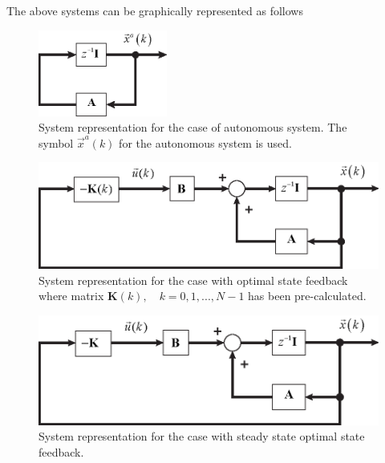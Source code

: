 \documentclass[11pt,a4paper,oneside]{book}
\numberwithin{equation}{section}
\theoremstyle{it}
\theoremstyle{definition}
\begin{document}
The above systems can be graphically represented as follows
\begin{figure}[H]
	\centering
	\includegraphics[width = 120pt, 
	keepaspectratio]{figures/optimal_control/autonomus_system.eps}
	\captionsetup{width=0.5\textwidth, font=small}
	\caption{System representation for the case of autonomous system. The 
		symbol $\vec{x}^a(k)$ for the autonomous system is used.}
	\label{figure_autonomous}
\end{figure}
\begin{figure}[H]
	\centering
	\includegraphics[width = 320pt, 
	keepaspectratio]{figures/optimal_control/optimal_ctrl_loop_simp.eps}
	\captionsetup{width=0.5\textwidth, font=small}
	\caption{System representation for the case with optimal state feedback 
		where matrix $\mathbf{K}(k),\quad k=0,1,...,N-1$ has been pre-calculated.}
	\label{figure_statefeedback}
\end{figure}
\begin{figure}[H]
	\centering
	\includegraphics[width = 320pt, 
	keepaspectratio]{figures/optimal_control/optimal_ctrl_loop_simp_steady.eps}
	\captionsetup{width=0.5\textwidth, font=small}
	\caption{System representation for the case with steady state optimal state 
		feedback.}
	\label{figure_statefeedbacksteady}
\end{figure}
\end{document}
